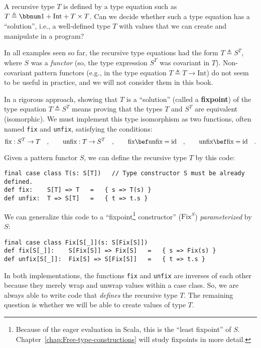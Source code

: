 A recursive type $T$ is defined by a type equation such as $T\triangleq\bbnum 1+\text{Int}+T\times T$.
Can we decide whether such a type equation has a \textsf{``}solution\textsf{''}, i.e.,
a well-defined type $T$ with values that we can create and manipulate
in a program?

In all examples seen so far, the recursive type equations
had the form $T\triangleq S^{T}$, where $S$ was a \emph{functor}
(so, the type expression $S^{T}$ was covariant in $T$). Non-covariant
pattern functors (e.g., in the type equation $T\triangleq T\rightarrow\text{Int}$)
do not seem to be useful in practice, and we will not consider them
in this book.

In a rigorous approach, showing that $T$ is a \textsf{``}solution\textsf{''} (called
a \textbf{fixpoint}) of the type equation $T\triangleq S^{T}$
means proving that the types $T$ and $S^{T}$ are equivalent (isomorphic).
We must implement this type isomorphism as two functions, often named
\lstinline!fix! and \lstinline!unfix!, satisfying the conditions:
\[
\text{fix}:S^{T}\rightarrow T\quad,\quad\quad\text{unfix}:T\rightarrow S^{T}\quad,\quad\quad\text{fix}\bef\text{unfix}=\text{id}\quad,\quad\quad\text{unfix}\bef\text{fix}=\text{id}\quad.
\]

Given a pattern functor $S$, we can define the recursive type $T$
by this code:
\begin{lstlisting}
final case class T(s: S[T])   // Type constructor S must be already defined.
def fix:    S[T] => T   =   { s => T(s) }
def unfix:  T => S[T]   =   { t => t.s }
\end{lstlisting}
We can generalize this code to a \textsf{``}fixpoint\footnote{Because of the eager evaluation in Scala, this is the \textsf{``}least fixpoint\textsf{''}
of $S$. Chapter~\ref{chap:Free-type-constructions} will study fixpoints
in more detail.} constructor\textsf{''} ($\text{Fix}^{S}$) \emph{parameterized} by $S$:
\begin{lstlisting}
final case class Fix[S[_]](s: S[Fix[S]])
def fix[S[_]]:    S[Fix[S]] => Fix[S]   =   { s => Fix(s) }
def unfix[S[_]]:  Fix[S] => S[Fix[S]]   =   { t => t.s }
\end{lstlisting}

In both implementations, the functions \lstinline!fix! and \lstinline!unfix!
are inverses of each other because they merely wrap and unwrap values
within a case class. So, we are always able to write code that \emph{defines}
the recursive type $T$. The remaining question is whether we will
be able to create values of type $T$.

